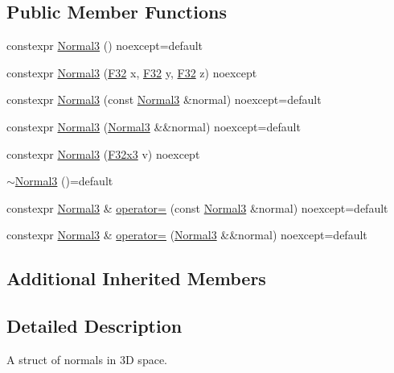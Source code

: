 \subsection*{Public Member Functions}
\begin{DoxyCompactItemize}
\item 
constexpr \mbox{\hyperlink{structmage_1_1_normal3_a31cd202f6cda288c0b4702e232007b39}{Normal3}} () noexcept=default
\item 
constexpr \mbox{\hyperlink{structmage_1_1_normal3_a7ff657d4eea97a894d0ee7ad3cb02a16}{Normal3}} (\mbox{\hyperlink{namespacemage_aa97e833b45f06d60a0a9c4fc22ae02c0}{F32}} x, \mbox{\hyperlink{namespacemage_aa97e833b45f06d60a0a9c4fc22ae02c0}{F32}} y, \mbox{\hyperlink{namespacemage_aa97e833b45f06d60a0a9c4fc22ae02c0}{F32}} z) noexcept
\item 
constexpr \mbox{\hyperlink{structmage_1_1_normal3_ae85b31999c0f2b3f63fd854275a9ef85}{Normal3}} (const \mbox{\hyperlink{structmage_1_1_normal3}{Normal3}} \&normal) noexcept=default
\item 
constexpr \mbox{\hyperlink{structmage_1_1_normal3_a2f0bf2d017db9e1e7e214d3a9a849764}{Normal3}} (\mbox{\hyperlink{structmage_1_1_normal3}{Normal3}} \&\&normal) noexcept=default
\item 
constexpr \mbox{\hyperlink{structmage_1_1_normal3_aefed0af318bd76295b614153e75c3846}{Normal3}} (\mbox{\hyperlink{namespacemage_a1e3c7a882af461f161caa1cbddaf1fa2}{F32x3}} v) noexcept
\item 
\mbox{\hyperlink{structmage_1_1_normal3_a3384b2970fd85fe729514ce0686b4446}{$\sim$\+Normal3}} ()=default
\item 
constexpr \mbox{\hyperlink{structmage_1_1_normal3}{Normal3}} \& \mbox{\hyperlink{structmage_1_1_normal3_aeeb43d61c914bc975c22e059b8bbeec9}{operator=}} (const \mbox{\hyperlink{structmage_1_1_normal3}{Normal3}} \&normal) noexcept=default
\item 
constexpr \mbox{\hyperlink{structmage_1_1_normal3}{Normal3}} \& \mbox{\hyperlink{structmage_1_1_normal3_a59aca1c2a1eb936c36bce64b4b5936b9}{operator=}} (\mbox{\hyperlink{structmage_1_1_normal3}{Normal3}} \&\&normal) noexcept=default
\end{DoxyCompactItemize}
\subsection*{Additional Inherited Members}


\subsection{Detailed Description}
A struct of normals in 3D space.

